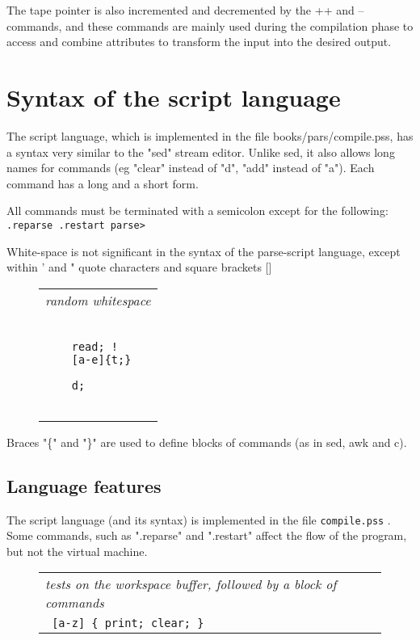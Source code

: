 \documentclass[a4paper,12pt]{article}
\begin{document}
  The tape pointer is also incremented and decremented by the
  ++ and -- commands, and these commands are mainly used during the
  compilation phase to access and combine attributes to transform
  the input into the desired output.

\section{Syntax of the script language}

  The script language, which is implemented in the file
  books/pars/compile.pss, has a syntax very similar to the "sed" stream
  editor. Unlike sed, it also allows long names for commands (eg "clear"
  instead of "d", "add" instead of "a"). Each command has a long and a short
  form.

  All commands must be terminated with a semicolon except for the following: 
 \verb| .reparse .restart parse> |


  White-space is not significant in the syntax of the parse-script
  language, except within ' and " quote characters and square brackets []
 \begin{figure}
 \begin{tabular}{ l }
 \emph{ random whitespace } \\ 
 \begin{lstlisting}[breaklines] 

    read; !
    [a-e]{t;}

    d;
  
 \end{lstlisting} 
 \end{tabular} 

 \end{figure}

  Braces "\{" and "\}" are used to define blocks of commands (as in
  sed, awk and c).

\subsection{Language features}

  The script language (and its syntax) is implemented in the file
  \texttt{compile.pss} . Some commands, such as ".reparse" and ".restart"
  affect the flow of the program, but not the virtual machine.
 \begin{figure}
 \begin{tabular}{ l }
 \emph{ tests on the workspace buffer, followed by a block of commands } \\ 
 \verb| [a-z] { print; clear; } |
 \end{tabular} 
 \end{figure}
   
\end{document}
